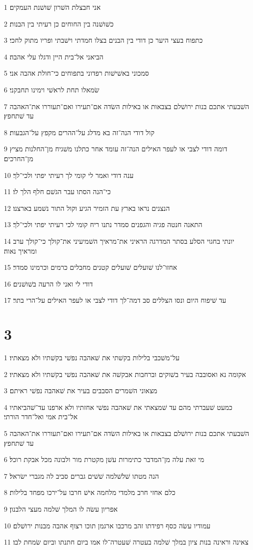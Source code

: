 \par 1 אני חבצלת השׁרון שׁושׁנת העמקים׃
\par 2 כשׁושׁנה בין החוחים כן רעיתי בין הבנות׃
\par 3 כתפוח בעצי היער כן דודי בין הבנים בצלו חמדתי וישׁבתי ופריו מתוק לחכי׃
\par 4 הביאני אל־בית היין ודגלו עלי אהבה׃
\par 5 סמכוני באשׁישׁות רפדוני בתפוחים כי־חולת אהבה אני׃
\par 6 שׂמאלו תחת לראשׁי וימינו תחבקני׃
\par 7 השׁבעתי אתכם בנות ירושׁלם בצבאות או באילות השׂדה אם־תעירו ואם־תעוררו את־האהבה עד שׁתחפץ׃
\par 8 קול דודי הנה־זה בא מדלג על־ההרים מקפץ על־הגבעות׃
\par 9 דומה דודי לצבי או לעפר האילים הנה־זה עומד אחר כתלנו משׁגיח מן־החלנות מציץ מן־החרכים׃
\par 10 ענה דודי ואמר לי קומי לך רעיתי יפתי ולכי־לך׃
\par 11 כי־הנה הסתו עבר הגשׁם חלף הלך לו׃
\par 12 הנצנים נראו בארץ עת הזמיר הגיע וקול התור נשׁמע בארצנו׃
\par 13 התאנה חנטה פגיה והגפנים סמדר נתנו ריח קומי לכי רעיתי יפתי ולכי־לך׃
\par 14 יונתי בחגוי הסלע בסתר המדרגה הראיני את־מראיך השׁמיעיני את־קולך כי־קולך ערב ומראיך נאוה׃
\par 15 אחזו־לנו שׁועלים שׁועלים קטנים מחבלים כרמים וכרמינו סמדר׃
\par 16 דודי לי ואני לו הרעה בשׁושׁנים׃
\par 17 עד שׁיפוח היום ונסו הצללים סב דמה־לך דודי לצבי או לעפר האילים על־הרי בתר׃

\chapter{3}

\par 1 על־משׁכבי בלילות בקשׁתי את שׁאהבה נפשׁי בקשׁתיו ולא מצאתיו׃
\par 2 אקומה נא ואסובבה בעיר בשׁוקים וברחבות אבקשׁה את שׁאהבה נפשׁי בקשׁתיו ולא מצאתיו׃
\par 3 מצאוני השׁמרים הסבבים בעיר את שׁאהבה נפשׁי ראיתם׃
\par 4 כמעט שׁעברתי מהם עד שׁמצאתי את שׁאהבה נפשׁי אחזתיו ולא ארפנו עד־שׁהביאתיו אל־בית אמי ואל־חדר הורתי׃
\par 5 השׁבעתי אתכם בנות ירושׁלם בצבאות או באילות השׂדה אם־תעירו ואם־תעוררו את־האהבה עד שׁתחפץ׃
\par 6 מי זאת עלה מן־המדבר כתימרות עשׁן מקטרת מור ולבונה מכל אבקת רוכל׃
\par 7 הנה מטתו שׁלשׁלמה שׁשׁים גברים סביב לה מגברי ישׂראל׃
\par 8 כלם אחזי חרב מלמדי מלחמה אישׁ חרבו על־ירכו מפחד בלילות׃
\par 9 אפריון עשׂה לו המלך שׁלמה מעצי הלבנון׃
\par 10 עמודיו עשׂה כסף רפידתו זהב מרכבו ארגמן תוכו רצוף אהבה מבנות ירושׁלם׃
\par 11 צאינה וראינה בנות ציון במלך שׁלמה בעטרה שׁעטרה־לו אמו ביום חתנתו וביום שׂמחת לבו׃


